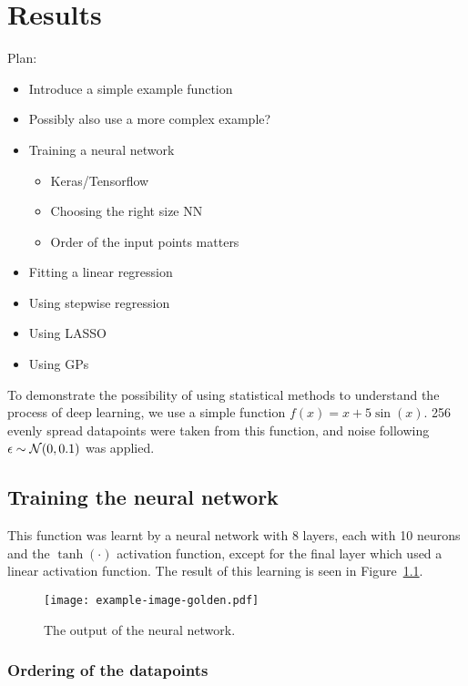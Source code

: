 
\chapter{Results}

Plan:
\begin{itemize}
	\item Introduce a simple example function
	\item Possibly also use a more complex example?
	\item Training a neural network
	      \begin{itemize}
		      \item Keras/Tensorflow
		      \item Choosing the right size NN
		      \item Order of the input points matters
	      \end{itemize}
	\item Fitting a linear regression
	\item Using stepwise regression
	\item Using LASSO
	\item Using GPs
\end{itemize}

To demonstrate the possibility of using statistical methods to understand the process of deep learning, we use a simple function \(f(x) = x + 5 \sin(x)\).
256 evenly spread datapoints were taken from this function, and noise following \(\epsilon \sim \mathcal{N}(0, 0.1)\) was applied.

\section{Training the neural network}

This function was learnt by a neural network with 8 layers, each with 10 neurons and the \(\tanh(\cdot)\) activation function, except for the final layer which used a linear activation function.
The result of this learning is seen in Figure~\ref{fig:ann-output}.

\begin{figure}[htbp]
	\centering
	\texttt{[image: example-image-golden.pdf]}
	\caption{The output of the neural network.}
	\label{fig:ann-output}
\end{figure}

\subsection{Ordering of the datapoints}

